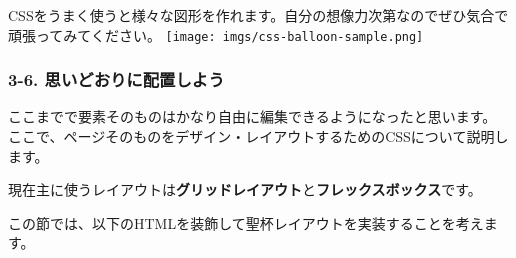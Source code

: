 \begin{itemize}
\begin{Shaded}
\begin{Highlighting}[]
    \NormalTok{: }\OperatorTok{;}
\NormalTok{  \}}
\end{Highlighting}
\end{Shaded}
\end{itemize}

CSSをうまく使うと様々な図形を作れます。自分の想像力次第なのでぜひ気合で頑張ってみてください。
\texttt{[image: imgs/css-balloon-sample.png]}

\subsubsection{3-6.
思いどおりに配置しよう}\label{ux601dux3044ux3069ux304aux308aux306bux914dux7f6eux3057ux3088ux3046}

ここまでで要素そのものはかなり自由に編集できるようになったと思います。\\
ここで、ページそのものをデザイン・レイアウトするためのCSSについて説明します。

現在主に使うレイアウトは\textbf{グリッドレイアウト}と\textbf{フレックスボックス}です。

この節では、以下のHTMLを装飾して聖杯レイアウトを実装することを考えます。

